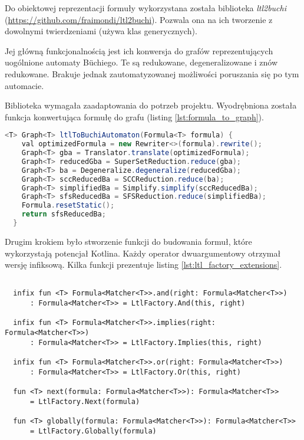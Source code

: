 Do obiektowej reprezentacji formuły wykorzystana została biblioteka \textit{ltl2buchi} \\(\url{https://github.com/fraimondi/ltl2buchi}).
Pozwala ona na ich tworzenie z dowolnymi twierdzeniami (używa klas generycznych).

Jej główną funkcjonalnością jest ich konwersja do grafów reprezentujących uogólnione automaty Büchiego.
Te są redukowane, degeneralizowane i znów redukowane.
Brakuje jednak zautomatyzowanej możliwości poruszania się po tym automacie.

Biblioteka wymagała zaadaptowania do potrzeb projektu.
Wyodrębniona została funkcja konwertująca formułę do grafu (listing \ref{lst:formula_to_graph}).

\begin{minipage}{\linewidth}
\begin{lstlisting}[caption={Funkcja konwertująca formułę LTL do grafu.},captionpos=b,label={lst:formula_to_graph},language=Java]
  <T> Graph<T> ltlToBuchiAutomaton(Formula<T> formula) {
    val optimizedFormula = new Rewriter<>(formula).rewrite();
    Graph<T> gba = Translator.translate(optimizedFormula);
    Graph<T> reducedGba = SuperSetReduction.reduce(gba);
    Graph<T> ba = Degeneralize.degeneralize(reducedGba);
    Graph<T> sccReducedBa = SCCReduction.reduce(ba);
    Graph<T> simplifiedBa = Simplify.simplify(sccReducedBa);
    Graph<T> sfsReducedBa = SFSReduction.reduce(simplifiedBa);
    Formula.resetStatic();
    return sfsReducedBa;
  }

\end{lstlisting}
\end{minipage}

Drugim krokiem było stworzenie funkcji do budowania formuł, które wykorzystają potencjał Kotlina.
Każdy operator dwuargumentowy otrzymał wersję infiksową.
Kilka funkcji prezentuje listing \ref{lst:ltl_factory_extensions}.

\begin{minipage}{\linewidth}
\begin{lstlisting}[caption={Przykładowe funkcje do budowania formuł w języku Kotlin.},captionpos=b,label={lst:ltl_factory_extensions}]

  infix fun <T> Formula<Matcher<T>>.and(right: Formula<Matcher<T>>)
      : Formula<Matcher<T>> = LtlFactory.And(this, right)

  infix fun <T> Formula<Matcher<T>>.implies(right: Formula<Matcher<T>>)
      : Formula<Matcher<T>> = LtlFactory.Implies(this, right)

  infix fun <T> Formula<Matcher<T>>.or(right: Formula<Matcher<T>>)
      : Formula<Matcher<T>> = LtlFactory.Or(this, right)

  fun <T> next(formula: Formula<Matcher<T>>): Formula<Matcher<T>>
      = LtlFactory.Next(formula)

  fun <T> globally(formula: Formula<Matcher<T>>): Formula<Matcher<T>>
      = LtlFactory.Globally(formula)

\end{lstlisting}
\end{minipage}

